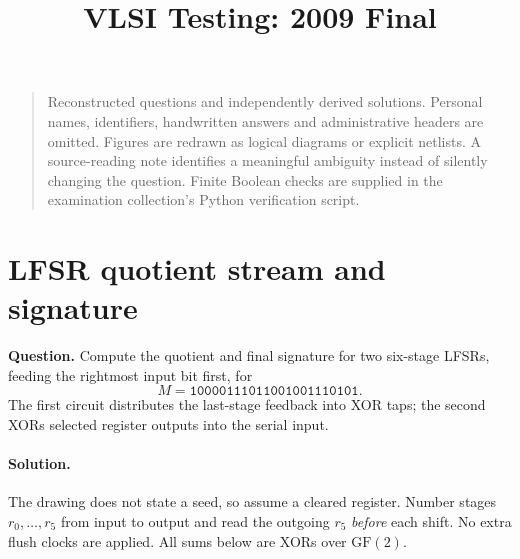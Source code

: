 \documentclass[11pt]{article}
\newcommand{\sol}{\paragraph{Solution.}}
\begin{document}
\title{VLSI Testing: 2009 Final}\author{}\date{}\maketitle\begin{quote}\small
Reconstructed questions and independently derived solutions. Personal names, identifiers,
handwritten answers and administrative headers are omitted. Figures are redrawn as
logical diagrams or explicit netlists. A source-reading note identifies a meaningful
ambiguity instead of silently changing the question. Finite Boolean checks
are supplied in the examination collection's Python verification script.
\end{quote}

\section{LFSR quotient stream and signature}
\textbf{Question.} Compute the quotient and final signature for two six-stage
LFSRs, feeding the rightmost input bit first, for
\[
M=\texttt{10000111011001001110101}.
\]
The first circuit distributes the last-stage feedback into XOR taps;
the second XORs selected register outputs into the serial input.
\begin{center}\end{center}

\sol The drawing does not state a seed, so assume a cleared register.
Number stages $r_0,\ldots,r_5$ from input to output and read the outgoing
$r_5$ \emph{before} each shift. No extra flush clocks are applied.
All sums below are XORs over $\mathrm{GF}(2)$.
\end{document}

